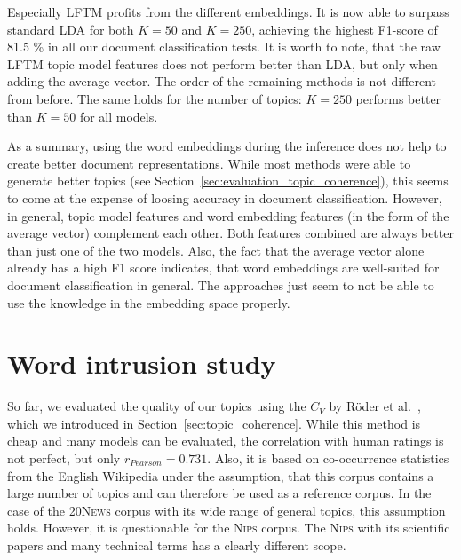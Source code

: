 \documentclass[
        a4paper,
        titlepage,
        twoside,
        parskip
        ]{scrbook}
\theoremstyle{break}
\begin{document}
Especially LFTM profits from the different embeddings.
It is now able to surpass standard LDA for both $K = 50$ and $K = 250$, achieving the highest F1-score of 81.5 \% in all our document classification tests.
It is worth to note, that the raw LFTM topic model features does not perform better than LDA, but only when adding the average vector.
The order of the remaining methods is not different from before.
The same holds for the number of topics: $K = 250$ performs better than $K = 50$ for all models.

As a summary, using the word embeddings during the inference does not help to create better document representations.
While most methods were able to generate better topics (see Section~\ref{sec:evaluation_topic_coherence}), this seems to come at the expense of loosing accuracy in document classification.
However, in general, topic model features and word embedding features (in the form of the average vector) complement each other.
Both features combined are always better than just one of the two models.
Also, the fact that the average vector alone already has a high F1 score indicates, that word embeddings are well-suited for document classification in general.
The approaches just seem to not be able to use the knowledge in the embedding space properly.

\section{Word intrusion study}

So far, we evaluated the quality of our topics using the $C_V$ by Röder et al.~\cite{Roder2015}, which we introduced in Section~\ref{sec:topic_coherence}.
While this method is cheap and many models can be evaluated, the correlation with human ratings is not perfect, but only $r_{Pearson} = 0.731$.
Also, it is based on co-occurrence statistics from the English Wikipedia under the assumption, that this corpus contains a large number of topics and can therefore be used as a reference corpus.
In the case of the \textsc{20News} corpus with its wide range of general topics, this assumption holds.
However, it is questionable for the \textsc{Nips} corpus.
The \textsc{Nips} with its scientific papers and many technical terms has a clearly different scope.
\end{document}
